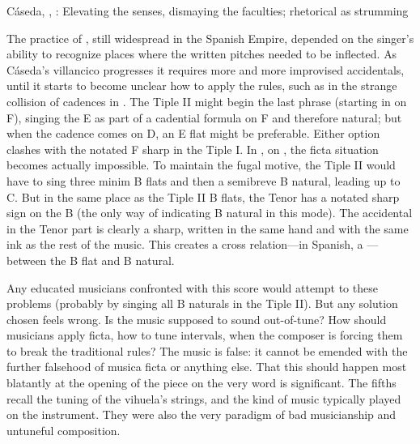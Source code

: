 \begin{musicexample}
    \caption{Cáseda, , : Elevating
    the senses, dismaying the faculties; rhetorical  as
    strumming}
    \label{mus:CasedaJ-Que_musica_divina-desmaya}
\end{musicexample}

The practice of , still widespread in the Spanish Empire,
depended on the singer's ability to recognize places where the written pitches
needed to be inflected.%
   \Autocite{Berger:Ficta} 
As Cáseda's villancico progresses it requires more and more improvised
accidentals, until it starts to become unclear how to apply the rules, such as
in the strange collision of cadences in .
The Tiple II might begin the last phrase (starting in  on F),
singing the E as part of a cadential formula on F and therefore natural; but
when the cadence comes on D, an E flat might be preferable. 
Either option clashes with the notated F sharp in the Tiple I.
In , on , the ficta situation becomes
actually impossible.
To maintain the fugal motive, the Tiple II would have to sing three minim B
flats and then a semibreve B natural, leading up to C.
But in the same place as the Tiple II B flats, the Tenor has a notated sharp
sign on the B (the only way of indicating B natural in this mode).
The accidental in the Tenor part is clearly a sharp, written in the same hand
and with the same ink as the rest of the music.
This creates a cross relation---in Spanish, a ---between
the B flat and B natural.


Any educated musicians confronted with this score would attempt to 
these problems (probably by singing all B naturals in the Tiple II).
But any solution chosen feels wrong.
Is the music supposed to sound out-of-tune?
How should musicians apply ficta, how to tune intervals, when the composer is
forcing them to break the traditional rules?
The music is false: it cannot be emended with the further falsehood of musica
ficta or anything else.
That this should happen most blatantly at the opening of the piece on the very
word  is significant.
The fifths recall the tuning of the vihuela's strings, and the kind of music
typically played on the instrument. 
They were also the very paradigm of bad musicianship and untuneful composition.

